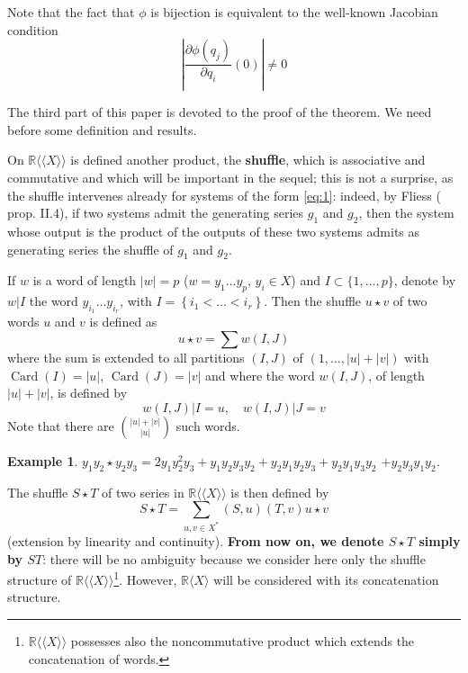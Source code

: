 \documentclass[a4paper,12pt]{article}
\newtheorem*{example*}{Example}
\newcommand{\card}{\operatorname{Card}}
\newcommand{\R}{\mathbb{R}}
\newcommand{\Rx}{\R\langle X\rangle}
\newcommand{\Rxx}{\R\langle\langle X\rangle\rangle}
\begin{document}

Note that the fact that $\phi$ is bijection is equivalent to the well-known Jacobian condition
\begin{equation*}
	\left|\frac{\partial \phi\left(q_j\right)}{\partial q_i}(0)\right| \neq 0
\end{equation*}

The third part of this paper is devoted to the proof of the theorem. We need before some definition and results.

On $\Rxx$ is defined another product, the \textbf{shuffle}, which is associative and commutative and which will be important in the sequel; this is not a surprise, as the shuffle intervenes already for systems of the form \eqref{eq:1}: indeed, by Fliess (\cite{4} prop. II.4), if two systems admit the generating series ${g}_1$ and ${g}_2$, then the system whose output is the product of the outputs of these two systems admits as generating series the shuffle of ${g}_1$ and ${g}_2$.

If $w$ is a word of length $|w|=p$ ($w=y_1 \ldots y_p$, $y_i \in X$) and $I \subset \{1, \ldots, p\}$, denote by $w|I$ the word $y_{i_1} \ldots y_{i_r}$, with $I=\left\{i_1<\ldots<i_r\right\}$. Then the shuffle $u \star v$ of two words $u$ and $v$ is defined as
\begin{equation*}
	u \star v= \sum w(I, J)
\end{equation*}
where the sum is extended to all partitions $(I, J)$ of $(1, \ldots,|u|+|v|)$ with $\card(I)=|u|$, $\card(J)=|v|$ and where the word $w(I, J)$, of length $|u|+|v|$, is defined by
\begin{equation*}
	w(I, J)|I=u, \quad w(I, J)| J=v
\end{equation*}
Note that there are ${|u|+|v|}\choose{|u|}$ such words.

\begin{example*}
	${y}_1 {y}_2 \star {y}_2 {y}_3=2 {y}_1 {y}_2^2 {y}_3+{y}_1 {y}_2 {y}_3 {y}_2+{y}_2 {y}_1 {y}_2 {y}_3+{y}_2 {y}_1 {y}_3 {y}_2$ $+{y}_2 {y}_3 {y}_1 {y}_2$. 
\end{example*}	
	
The shuffle $S \star T$ of two series in $\Rxx$ is then defined by
\begin{equation*}
	S \star T =\sum_{{u}, {v} \in {X}^*}(S, {u})({T}, {v}) {u} \star {v}
\end{equation*}
(extension by linearity and continuity). \textbf{From now on, we denote $S \star T$ simply by ${S} {T}$}: there will be no ambiguity because we consider here only the shuffle structure of $\Rxx$\footnote{$\Rxx$ possesses also the noncommutative product which extends the concatenation of words.}. However, $\Rx$ will be considered with its concatenation structure.
\end{document}
